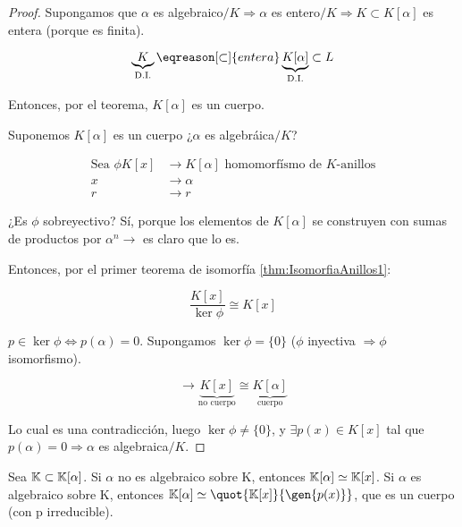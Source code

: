 	\begin{proof}

	\proofpart{$\implies$}

		Supongamos que $\alpha$ es algebraico$/K \Rightarrow \alpha$ es entero$/K \Rightarrow K \subset K[\alpha]$ es entera (porque es finita).

		\[ \underbrace{K}_{\text{D.I.}} \eqreason[\subset]{entera} \underbrace{K[\alpha]}_{\text{D.I.}} \subset L\]

		Entonces, por el teorema, $K[\alpha]$ es un cuerpo.

	\proofpart{$\impliedby$}

		Suponemos $K[\alpha]$ es un cuerpo ¿$\alpha$ es algebráica$/K$?

		\begin{align*}
			\text{Sea } \phi K[x] &\longrightarrow K[\alpha] \text{ homomorfísmo de }K\text{-anillos}\\
			x &\longrightarrow \alpha \\
			r &\longrightarrow r
		\end{align*}

		¿Es $\phi$ sobreyectivo? Sí, porque los elementos de $K[\alpha]$ se construyen con sumas de productos por $\alpha^n \rightarrow $ es claro que lo es.

		Entonces, por el primer teorema de isomorfía \ref{thm:IsomorfiaAnillos1}:

		\[ \frac{K[x]}{\ker \phi} \cong K[x]\]

		$p \in \ker \phi \Leftrightarrow p(\alpha) = 0 $. Supongamos $\ker \phi = \{0\}$ ($\phi$ inyectiva $\Rightarrow \phi$ isomorfismo).

		\[ \rightarrow \underbrace{K[x]}_{\text{no cuerpo}} \cong \underbrace{K[\alpha]}_{\text{cuerpo}}  \]

		Lo cual es una contradicción, luego $\ker \phi \neq \{0\}$, y $\exists p(x) \in K[x]$ tal que $p(\alpha) = 0 \Rightarrow \alpha $ es algebraica$/K$.
	\end{proof}



Sea  $\mathbb{K} \subset \mathbb{K}[\alpha]$. Si $\alpha$ no es algebraico sobre K, entonces $\mathbb{K}[\alpha]\simeq \mathbb{K}[x]$. Si $\alpha$ es algebraico sobre K, entonces $\K[\alpha] \simeq \quot{\K[x]}{\gen{p(x)}}$, que es un cuerpo (con p irreducible).


